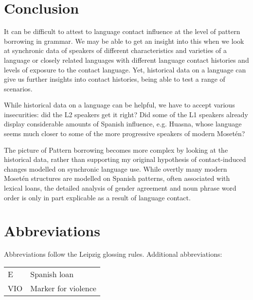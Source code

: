 \documentclass[output=paper,colorlinks,citecolor=brown
]{langscibook}
\begin{document}
\section{Conclusion}
It can be difficult to attest to language contact influence at the level of pattern borrowing in grammar. We may be able to get an insight into this when we look at synchronic data of speakers of different characteristics and varieties of a language or closely related languages with different language contact histories and levels of exposure to the contact language. Yet, historical data on a language can give us further insights into contact histories, being able to test a range of scenarios.

While historical data on a language can be helpful, we have to accept various insecurities: did the L2 speakers get it right? Did some of the L1 speakers already display considerable amounts of Spanish influence, e.g. Huasna, whose language seems much closer to some of the more progressive speakers of modern Mosetén?

The picture of Pattern borrowing becomes more complex by looking at the historical data, rather than supporting my original hypothesis of contact-induced changes modelled on synchronic language use. While overtly many modern Mosetén structures are modelled on Spanish patterns, often associated with lexical loans, the detailed analysis of gender agreement and noun phrase word order is only in part explicable as a result of language contact. 



\section*{Abbreviations}
Abbreviations follow the Leipzig glossing rules. Additional abbreviations:\medskip\\
\noindent\begin{tabularx}{.5\textwidth}{@{}lQ@{}}
E & Spanish loan\\
VIO & Marker for violence\\ 
\end{tabularx}%

\printbibliography[heading=subbibliography,notkeyword=this]
\end{document}
